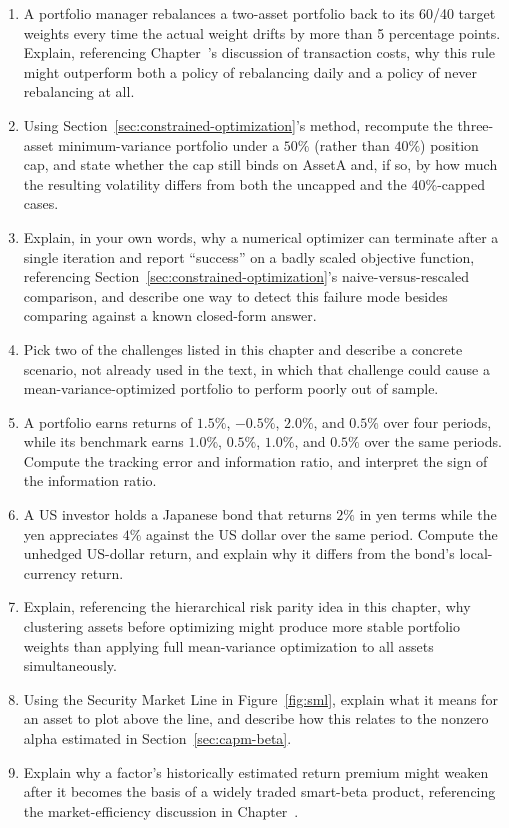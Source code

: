 \documentclass[../ai_in_finance]{subfiles}
\begin{document}
\begin{enumerate}[exercises]
    \item A portfolio manager rebalances a two-asset portfolio back to its 60/40 target weights every time the actual weight drifts by more than 5 percentage points. Explain, referencing Chapter~'s discussion of transaction costs, why this rule might outperform both a policy of rebalancing daily and a policy of never rebalancing at all.
    \item Using Section~\ref{sec:constrained-optimization}'s method, recompute the three-asset minimum-variance portfolio under a $50\%$ (rather than $40\%$) position cap, and state whether the cap still binds on AssetA and, if so, by how much the resulting volatility differs from both the uncapped and the $40\%$-capped cases.
    \item Explain, in your own words, why a numerical optimizer can terminate after a single iteration and report ``success'' on a badly scaled objective function, referencing Section~\ref{sec:constrained-optimization}'s naive-versus-rescaled comparison, and describe one way to detect this failure mode besides comparing against a known closed-form answer.
    \item Pick two of the challenges listed in this chapter and describe a concrete scenario, not already used in the text, in which that challenge could cause a mean-variance-optimized portfolio to perform poorly out of sample.
    \item A portfolio earns returns of $1.5\%$, $-0.5\%$, $2.0\%$, and $0.5\%$ over four periods, while its benchmark earns $1.0\%$, $0.5\%$, $1.0\%$, and $0.5\%$ over the same periods. Compute the tracking error and information ratio, and interpret the sign of the information ratio.
    \item A US investor holds a Japanese bond that returns $2\%$ in yen terms while the yen appreciates $4\%$ against the US dollar over the same period. Compute the unhedged US-dollar return, and explain why it differs from the bond's local-currency return.
    \item Explain, referencing the hierarchical risk parity idea in this chapter, why clustering assets before optimizing might produce more stable portfolio weights than applying full mean-variance optimization to all assets simultaneously.
    \item Using the Security Market Line in Figure~\ref{fig:sml}, explain what it means for an asset to plot above the line, and describe how this relates to the nonzero alpha estimated in Section~\ref{sec:capm-beta}.
    \item Explain why a factor's historically estimated return premium might weaken after it becomes the basis of a widely traded smart-beta product, referencing the market-efficiency discussion in Chapter~.

\end{enumerate}
\end{document}
